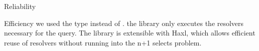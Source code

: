\begin{frame}[allowframebreaks]
\begin{block}{Reliability}
\begin{itemize}
\end{itemize}

\end{block}

\begin{block}{Efficiency} we used the type  instead of . the library only executes the resolvers necessary for the query. The library is extensible with Haxl, which allows efficient reuse of resolvers without running into the n+1 selects problem.

\end{block}

\end{frame}
